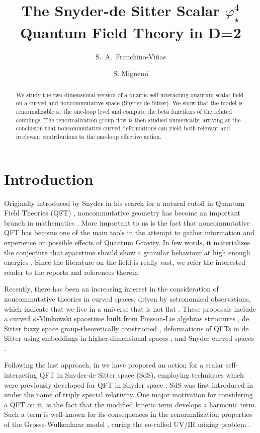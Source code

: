 \documentclass[a4paper,10pt]{amsart}
\title{The Snyder-de Sitter Scalar $\varphi^4_{\star}$ Quantum Field Theory in D=2}
\author{S.~A.~Franchino-Vi\~nas}
\author{S. Mignemi}
\newcommand{\nocol}[1]{{#1}}
\begin{document}
\begin{abstract}
We study the two-dimensional version of a quartic self-interacting quantum scalar field on a curved and noncommutative space (Snyder-de Sitter).
We show that the model is renormalizable at the one-loop level and compute the beta functions of the related couplings.
The renormalization group flow is then studied numerically,
arriving at the conclusion that noncommutative-curved deformations can yield both relevant and irrelevant contributions to the one-loop effective action.
\end{abstract}
\maketitle

\section{Introduction}
Originally introduced by Snyder in his search for  a natural cutoff in Quantum Field Theories (QFT) \cite{Snyder:1946qz},
noncommutative geometry has become an important branch in mathematics \cite{Connes:1994yd}.
More important to us is the fact that noncommutative QFT has become one of the main tools in the attempt to
gather information and experience on possible effects of Quantum Gravity.
In few words, it materializes the conjecture that spacetime should show a granular behaviour at high enough energies \cite{Doplicher:1994tu}.
Since the literature on the field is really vast, we refer the interested reader to the reports \cite{Douglas:2001ba, Szabo:2001kg}
and references therein.

Recently, there has been an increasing interest in the consideration of noncommutative theories in curved spaces,
driven by astronomical observations, which indicate that we live in a universe that is not flat \cite{Aghanim:2018eyx}.
These proposals include a curved $\kappa$-Minkowski spacetime built from
Poisson-Lie algebras structures \cite{Gutierrez-Sagredo:2019ipf, Ballesteros:2019hbw},
de Sitter fuzzy space group-theoretically constructed \cite{Buric:2020wwk, Buric:2019yau, Buric:2018kdi},
deformations of QFTs in de Sitter using embeddings in higher-dimensional spaces \cite{Frob:2020ctp},
and Snyder curved spaces \cite{KowalskiGlikman:2004kp, Mignemi:2008fj, Mignemi:2015una}.

Following the last approach, in \cite{Franchino-Vinas:2019nqy} we have proposed an action for a scalar self-interacting QFT in Snyder-de Sitter space (SdS),
\nocol{employing techniques which were previously developed for QFT in Snyder space \cite{ Meljanac:2017ikx, Meljanac:2017grw, Meljanac:2017jyk, Vinas:2014exa}.
SdS was first introduced in \cite{KowalskiGlikman:2004kp} under the name of triply special relativity.
One major motivation for considering a QFT on it, is the fact that the modified kinetic term develops a harmonic term.
Such a term is well-known for its consequences in the renormalization properties of the Grosse-Wulkenhaar model \cite{Grosse:2019qps, Grosse:2005da, Grosse:2004by}},
curing the so-called UV/IR mixing problem \cite{Minwalla:1999px}.
\end{document}
